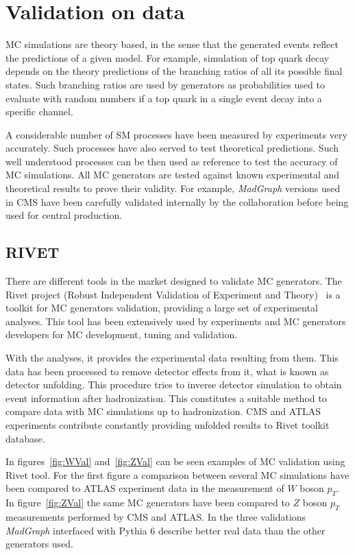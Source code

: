 \section{Validation on data}
\label{sec:val}

MC simulations are theory based, in the sense that the generated events reflect the predictions of a given model. For example, simulation of top quark decay depends on the theory predictions of the branching ratios of all its possible final states. Such branching ratios are used by generators as probabilities used to evaluate with random numbers if a top quark in a single event decay into a specific channel. 

A considerable number of SM processes have been measured by experiments very accurately. Such processes have also served to test theoretical predictions. Such well understood processes can be then used as reference to test the accuracy of MC simulations. All MC generators are tested against known experimental and theoretical results to prove their validity. For example, \textit{MadGraph} versions used in CMS have been carefully validated internally by the collaboration before being used for central production.

\subsection{RIVET}
\label{sec:rivet}

There are different tools in the market designed to validate MC generators. The Rivet project (Robust Independent Validation of Experiment and Theory)~\cite{Buckley:2010ar} is a toolkit for MC generators validation, providing a large set of experimental analyses. This tool has been extensively used by experiments and MC generators developers for MC development, tuning and validation. 

With the analyses, it provides the experimental data resulting from them. This data has been processed to remove detector effects from it, what is known as detector unfolding. This procedure tries to inverse detector simulation to obtain event information after hadronization. This constitutes a suitable method to compare data with MC simulations up to hadronization. CMS and ATLAS experiments contribute constantly providing unfolded results to Rivet toolkit database.

In figures~\ref{fig:WVal} and~\ref{fig:ZVal} can be seen examples of MC validation using Rivet tool. For the first figure a comparison between several MC simulations have been compared to ATLAS experiment data in the measurement of $W$ boson $p_{T}$. In figure~\ref{fig:ZVal} the same MC generators have been compared to $Z$ boson $p_{T}$ measurements performed by CMS and ATLAS. In the three validations \textit{MadGraph} interfaced with Pythia 6 describe better real data than the other generators used. 

